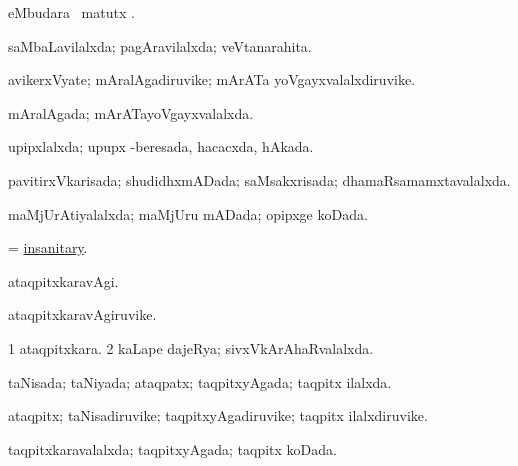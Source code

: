 \bentry
{} 
\gl{\sakirx}
\expl{}
\bmng
{} eMbudara \BU\ matutx \BUkaq. 
\emng
\eentry

\bentry
{} 
\gl{\gu}
\expl{}
\bmng
saMbaLavilalxda; pagAravilalxda; veVtanarahita. 
\emng
\eentry

\bentry
{} 
\gl{\nA}
\expl{}
\bmng
avikerxVyate; mAralAgadiruvike; mArATa yoVgayxvalalxdiruvike. 
\emng
\eentry

\bentry
{} 
\gl{\gu}
\expl{}
\bmng
mAralAgada; mArATayoVgayxvalalxda. 
\emng
\eentry

\bentry
{} 
\gl{\gu}
\expl{}
\bmng
upipxlalxda; upupx -beresada, hacacxda, hAkada. 
\emng
\eentry

\bentry
{} 
\gl{\gu}
\expl{}
\bmng
pavitirxVkarisada; shudidhxmADada; saMsakxrisada; dhamaRsamamxtavalalxda. 
\emng
\eentry

\bentry
{} 
\gl{\gu}
\expl{}
\bmng
maMjUrAtiyalalxda; maMjUru mADada; opipxge koDada. 
\emng
\eentry

\bentry
{} 
\gl{\gu}
\expl{}
\bmng
= \hyperref{kandict_i.pdf}{I}{insanitary}{insanitary}. 
\emng
\eentry

\bentry
{} 
\gl{\kirxvi}
\expl{}
\bmng
ataqpitxkaravAgi. 
\emng
\eentry

\bentry
{} 
\gl{\nA}
\expl{}
\bmng
ataqpitxkaravAgiruvike. 
\emng
\eentry

\bentry
{} 
\gl{\gu}
\expl{}
\bmng
\bnum
\num{1} ataqpitxkara. 
\num{2} kaLape dajeRya; sivxVkArAhaRvalalxda. 
\enum
\emng
\eentry

\bentry
{} 
\gl{\gu}
\expl{}
\bmng
taNisada; taNiyada; ataqpatx; taqpitxyAgada; taqpitx ilalxda. 
\emng
\eentry

\bentry
{} 
\gl{\nA}
\expl{}
\bmng
ataqpitx; taNisadiruvike; taqpitxyAgadiruvike; taqpitx ilalxdiruvike. 
\emng
\eentry

\bentry
{} 
\gl{\gu}
\expl{}
\bmng
taqpitxkaravalalxda; taqpitxyAgada; taqpitx koDada. 
\emng
\eentry

